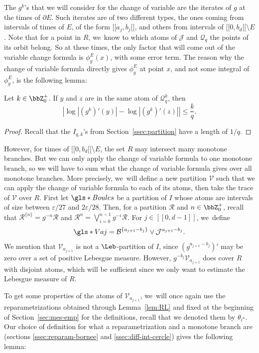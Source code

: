 The $g^k$'s that we will consider for the change of variable are the iterates of $g$ at the times of $\partial E$.
Such iterates are of two different types, the ones coming from intervals of times of $E$, of the form $[\![ a_j, b_j [\![$, and others from intervals of $[\![ 0, b_d [\![ \setminus E$.
Note that for a point in $R$, we~know to which atoms of $\mathcal{J}$ and $\mathcal{Q}_q$ the points of its orbit belong.
So at these times, the only factor that will come out of the variable change formula is $\phi_g^E(x)$, with some error term.
The reason why the change of variable formula directly gives $\phi_g^E$ at point $x$, and not some integral of $\phi_g^E$, is the following lemma:

\begin{lem}
\label{lem:Qq-util-gibbs}
Let $k \in \bbZ_0^+$. If $y$ and $z$ are in the same atom of $\mathcal{Q}_{q}^k$, then
\[
\left | \log |(g^k)'(y)| - \log |(g^k)'(z)| \right | \leq \frac{k}{q}.
\]
\end{lem}

\begin{proof}
Recall that the $I_{q,k}$'s from Section~\ref{ssec:partition} have a length of $1/q$.
\end{proof}

However, for times of $[\![ 0, b_d [\![ \setminus E$, the set $R$ may intersect many monotone branches.
But we can only apply the change of variable formula to one monotone branch, so we will have to sum what the change of variable formula gives over all monotone branches.
More precisely, we~will define a new partition $\mathcal{V}$ such that we can apply the change of variable formula to each of its atoms, then take the trace of $\mathcal{V}$ over $R$.
First let
$\gls*{Boules}$ be a partition of $I$ whose atoms are intervals of size between $\varepsilon / 27$ and $2 \varepsilon / 28$.
Then, for a partition $\mathcal{R}$ and $n \in \bbZ_0^+$, recall that
$
\mathcal{R}^{\{ n \}} = g^{-n} \mathcal{R}$ and
$\mathcal{R}^n = \bigvee_{i=0}^{n-1} g^{-i} \mathcal{R}$.
For $j \in [\![ 0, d-1 ]\!]$, we~define
\[
\gls*{Vaj} = \mathcal{B}^{\{a_{j+1} - b_j \}} \vee \mathcal{J}^{a_{j+1}-b_j}.
\]
We mention that $\mathcal{V}_{a_{j+1}}$ is not a $\Leb$-partition of $I$, since $(g^{a_{j+1}-b_j})'$ may be zero over a set of positive Lebesgue measure.
However, $g^{-b_j} \mathcal{V}_{a_{j+1}}$ does cover $R$ with disjoint atoms, which will be sufficient since we only want to estimate the Lebesgue measure of $R$.

To get some properties of the atoms of $\mathcal{V}_{a_{j+1}}$, we~will once again use the reparametrizations obtained through Lemma~\ref{lem:RL} and fixed at the beginning of Section~\ref{sec:mes-emp} for the definitions, recall that we denoted them by $\theta_{i^n}$.
Our choice of definition for what a reparametrization and a monotone branch are (sections \ref{ssec:reparam-bornee} and \ref{ssec:diff-int-cercle}) gives the following lemma:

